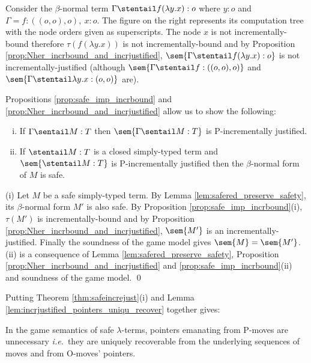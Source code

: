 \begin{example}
Consider the $\beta$-normal term $\Gamma\stentail f (\lambda y .x) :
o$ where $y:o$ and $\Gamma =f:((o,o),o),~x:o$. The figure on the
right represents its computation tree with the node orders given as
superscripts.  The node $x$ is not incrementally-bound therefore $\tau(f
(\lambda y .x))$ is not incrementally-bound and by Proposition
\ref{prop:Nher_incrbound_and_incrjustified}, $\sem{\Gamma \stentail
f (\lambda y .x) : o}$ is not incrementally-justified (although
$\sem{\Gamma \stentail f : ((o,o),o)}$ and $\sem{\Gamma \stentail
\lambda
  y. x : (o,o)}$ are).
\end{example}
\smallskip

Propositions \ref{prop:safe_imp_incrbound} and
\ref{prop:Nher_incrbound_and_incrjustified} allow us to show the
following:
\begin{theorem}
\label{thm:safeincrejust} \hfill
\begin{enumerate}[(i)]
\item If $\Gamma \sentail M : T$ then $\sem{\Gamma \sentail M : T}$ is P-incrementally justified.
\item If $\stentail M : T$ is a closed simply-typed term and $\sem{\stentail M : T}$ is P-incrementally justified then the $\beta$-normal form of $M$ is safe.
\end{enumerate}
\end{theorem}
\proof (i) Let $M$ be a safe simply-typed term. By Lemma
\ref{lem:safered_preserve_safety}, its $\beta$-normal form $M'$ is
also safe. By Proposition \ref{prop:safe_imp_incrbound}(i),
$\tau(M')$ is incrementally-bound and by Proposition
\ref{prop:Nher_incrbound_and_incrjustified}, $\sem{M'}$ is an
incrementally-justified. Finally the soundness of the game model
gives $\sem{M} = \sem{M'}$.  (ii) is a consequence of Lemma
\ref{lem:safered_preserve_safety}, Proposition
\ref{prop:Nher_incrbound_and_incrjustified} and
\ref{prop:safe_imp_incrbound}(ii) and soundness of the game model.
\qed



Putting Theorem \ref{thm:safeincrejust}(i) and Lemma
\ref{lem:incrjustified_pointers_uniqu_recover} together gives:
\begin{proposition}
  \label{prop:safe_ptr_recoverable} In the game semantics of safe
  $\lambda$-terms, pointers emanating from P-moves are unnecessary
  {\it i.e.}~they are uniquely recoverable from the underlying sequences of
  moves and from O-moves' pointers.
\end{proposition}

